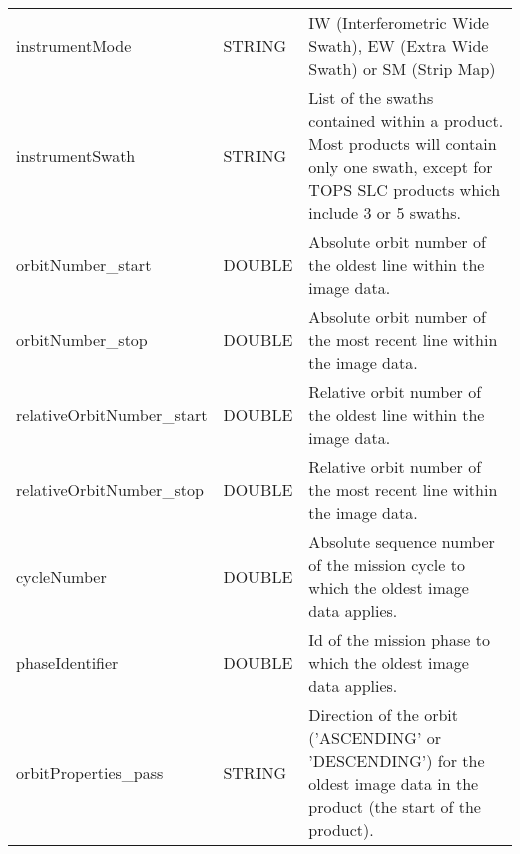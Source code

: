 \documentclass[lettersize,journal]{IEEEtran}
\begin{document}
\begin{table*}[h]
{\begin{tabular}{llp{12cm}}
instrumentMode                                   & STRING                            & IW (Interferometric Wide Swath), EW (Extra Wide Swath) or SM (Strip Map)                                                                                                \\
instrumentSwath                                  & STRING                            & List of the swaths contained within a product. Most products will contain only one swath, except for TOPS SLC products which include 3 or 5 swaths.                     \\
orbitNumber\_start                               & DOUBLE                            & Absolute orbit number of the oldest line within the image data.                                                                                                         \\
orbitNumber\_stop                                & DOUBLE                            & Absolute orbit number of the most recent line within the image data.                                                                                                    \\
relativeOrbitNumber\_start                       & DOUBLE                            & Relative orbit number of the oldest line within the image data.                                                                                                         \\
relativeOrbitNumber\_stop                        & DOUBLE                            & Relative orbit number of the most recent line within the image data.                                                                                                    \\
cycleNumber                                      & DOUBLE                            & Absolute sequence number of the mission cycle to which the oldest image data applies.                                                                                   \\
phaseIdentifier                                  & DOUBLE                            & Id of the mission phase to which the oldest image data applies.                                                                                                         \\
orbitProperties\_pass                            & STRING                            & Direction of the orbit ('ASCENDING' or 'DESCENDING') for the oldest image data in the product (the start of the product).                                               \\

\end{tabular}}
\end{table*}
\end{document}
